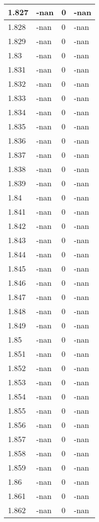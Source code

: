 \documentclass[a4paper,14pt]{extarticle}
\begin{document}
\begin{longtable}{||m{3cm}||m{3cm}|m{3cm}||m{3cm}||}
\hline
1.827 & -nan & 0 & -nan\\
\hline
1.828 & -nan & 0 & -nan\\
\hline
1.829 & -nan & 0 & -nan\\
\hline
1.83 & -nan & 0 & -nan\\
\hline
1.831 & -nan & 0 & -nan\\
\hline
1.832 & -nan & 0 & -nan\\
\hline
1.833 & -nan & 0 & -nan\\
\hline
1.834 & -nan & 0 & -nan\\
\hline
1.835 & -nan & 0 & -nan\\
\hline
1.836 & -nan & 0 & -nan\\
\hline
1.837 & -nan & 0 & -nan\\
\hline
1.838 & -nan & 0 & -nan\\
\hline
1.839 & -nan & 0 & -nan\\
\hline
1.84 & -nan & 0 & -nan\\
\hline
1.841 & -nan & 0 & -nan\\
\hline
1.842 & -nan & 0 & -nan\\
\hline
1.843 & -nan & 0 & -nan\\
\hline
1.844 & -nan & 0 & -nan\\
\hline
1.845 & -nan & 0 & -nan\\
\hline
1.846 & -nan & 0 & -nan\\
\hline
1.847 & -nan & 0 & -nan\\
\hline
1.848 & -nan & 0 & -nan\\
\hline
1.849 & -nan & 0 & -nan\\
\hline
1.85 & -nan & 0 & -nan\\
\hline
1.851 & -nan & 0 & -nan\\
\hline
1.852 & -nan & 0 & -nan\\
\hline
1.853 & -nan & 0 & -nan\\
\hline
1.854 & -nan & 0 & -nan\\
\hline
1.855 & -nan & 0 & -nan\\
\hline
1.856 & -nan & 0 & -nan\\
\hline
1.857 & -nan & 0 & -nan\\
\hline
1.858 & -nan & 0 & -nan\\
\hline
1.859 & -nan & 0 & -nan\\
\hline
1.86 & -nan & 0 & -nan\\
\hline
1.861 & -nan & 0 & -nan\\
\hline
1.862 & -nan & 0 & -nan\\

\end{longtable}
\end{document}
